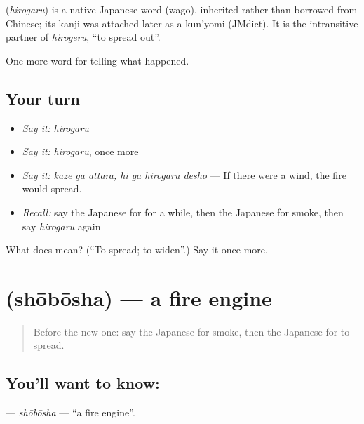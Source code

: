 \begin{cousinweb}
\textbf{} (\emph{hirogaru}) is a native Japanese word (wago), inherited rather than borrowed from Chinese; its kanji was attached later as a kun'yomi (JMdict). It is the intransitive partner of \emph{hirogeru}, \textquotedblleft{}to spread out\textquotedblright{}.
\end{cousinweb}

\begin{grammarlens}[title={What you've built}]
One more word for telling what happened.
\end{grammarlens}

\subsection*{Your turn}
\begin{itemize}
\raggedright
  \item \emph{Say it:} \emph{hirogaru}
  \item \emph{Say it:} \emph{hirogaru}, once more
  \item \emph{Say it:} \emph{kaze ga attara, hi ga hirogaru deshō} — If there were a wind, the fire would spread.
  \item \emph{Recall:} say the Japanese for for a while, then the Japanese for smoke, then say \emph{hirogaru} again
\end{itemize}

\begin{tcolorbox}[breakable,colback=teal!4,colframe=teal!35!black,title={Before you move on}]
What does  mean? (\textquotedblleft{}To spread; to widen\textquotedblright{}.) Say it once more.
\end{tcolorbox}
\section[\texorpdfstring{\ja{しょうぼうしゃ} (shōbōsha)}{しょうぼうしゃ (shōbōsha)}]{ (shōbōsha) — a fire engine}

\label{lesson:JA-C265-shoubousha}



\begin{quote}
Before the new one: say the Japanese for smoke, then the Japanese for to spread.
\end{quote}

\subsection*{You'll want to know: }
\textbf{} — \emph{shōbōsha} — \textquotedblleft{}a fire engine\textquotedblright{}.

